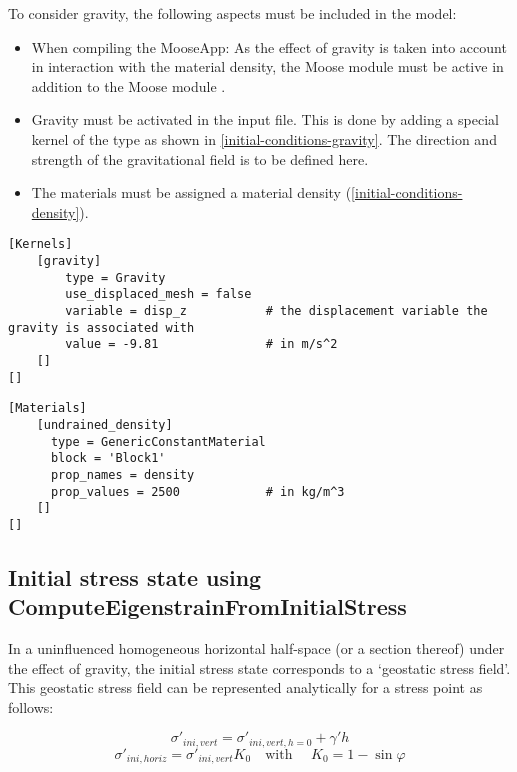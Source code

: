 To consider gravity, the following aspects must be included in the model:
\begin{itemize}
    \item When compiling the MooseApp: As the effect of gravity is taken into account in
          interaction with the material density, the Moose module  must be
          active in addition to the Moose module .
    \item Gravity must be activated in the input file. This is done by adding a special
          kernel of the type  as shown in
          \autoref{initial-conditions-gravity}. The direction and strength of the
          gravitational field is to be defined here.
    \item The materials must be assigned a material density
          (\autoref{initial-conditions-density}).
\end{itemize}

\begin{lstlisting}[language=Moose, float, caption={Gravity kernel in a Moose inut file},label={initial-conditions-gravity}]
[Kernels]
    [gravity]
        type = Gravity
        use_displaced_mesh = false
        variable = disp_z           # the displacement variable the gravity is associated with
        value = -9.81               # in m/s^2
    []
[]
\end{lstlisting}

\begin{lstlisting}[language=Moose, float, caption={Assignment of a density to subdomain ‘block1’},label={initial-conditions-density}]
[Materials]
    [undrained_density]
      type = GenericConstantMaterial
      block = 'Block1'
      prop_names = density
      prop_values = 2500            # in kg/m^3
    []
[]
\end{lstlisting}

{\hfuzz=20pt
\subsection{Initial stress state using ComputeEigenstrainFromInitialStress}
}
\label{chap:IC-stress-state-simple}

In a uninfluenced homogeneous horizontal half-space (or a section thereof)
under the effect of gravity, the initial stress state corresponds to a
‘geostatic stress field’. This geostatic stress field can be represented
analytically for a stress point as follows:

\begin{equation}
    \sigma'_{ini,vert}=\sigma'_{ini,vert,h=0}+\gamma' h
\end{equation}
\begin{equation}
    \sigma'_{ini,horiz}=\sigma'_{ini,vert} K_0 \quad \text{with } \quad K_0 = 1-\sin\varphi
\end{equation}

